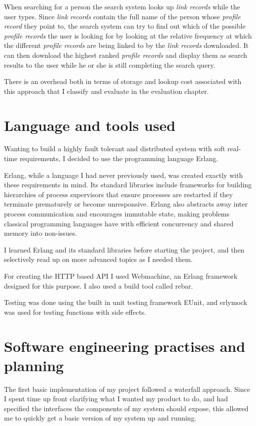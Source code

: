 When searching for a person the search system looks up \emph{link records} while the user types. Since \emph{link records} contain the full name of the person whose \emph{profile record} they point to, the search system can try to find out which of the possible \emph{profile records} the user is looking for by looking at the relative frequency at which the different \emph{profile records} are being linked to by the \emph{link records} downloaded. It can then download the highest ranked \emph{profile records} and display them as search results to the user while he or she is still completing the search query.

There is an overhead both in terms of storage and lookup cost associated with this approach that I classify and evaluate in the evaluation chapter.

\section{Language and tools used}
Wanting to build a highly fault tolerant and distributed system with soft real-time requirements, I decided to use the programming language Erlang.

Erlang, while a language I had never previously used, was created exactly with these requirements in mind. Its standard libraries include frameworks for building hierarchies of process supervisors that ensure processes are restarted if they terminate prematurely or become unresponsive. Erlang also abstracts away inter process communication and encourages immutable state, making problems classical programming languages have with efficient concurrency and shared memory into non-issues.

I learned Erlang and its standard libraries before starting the project, and then selectively read up on more advanced topics as I needed them.

For creating the HTTP based API I used Webmachine, an Erlang framework designed for this purpose. I also used a build tool called rebar.

Testing was done using the built in unit testing framework EUnit, and erlymock was used for testing functions with side effects.

\section{Software engineering practises and planning}
The first basic implementation of my project followed a waterfall approach. Since I spent time up front clarifying  what I wanted my product to do, and had specified the interfaces the components of my system should expose, this allowed me to quickly get a basic version of my system up and running.

